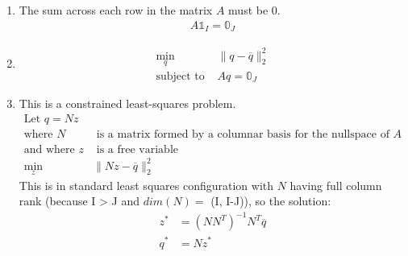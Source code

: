 \documentclass[11pt]{article}
\begin{document}
\begin{solution}
\begin{enumerate}
\item The sum across each row in the matrix $A$ must be 0.
\begin{align*}
    A \mathbb{1}_I = \mathbb{0}_J
\end{align*}

\item
\begin{align*}
    \min_q &\|q - \overline{q}\|_2^2 \\
    \text{subject to } & A q = \mathbb{0}_J
\end{align*}

\item This is a constrained least-squares problem.
\begin{align*}
    \text{Let } q = N z \\
    \text{where } N &\text{ is a matrix formed by a columnar basis for the nullspace of } A \\
    \text{and where } z& \text{ is a free variable} \\
    \min_z &\|Nz - \overline{q}\|_2^2
\end{align*}
        This is in standard least squares configuration with $N$ having full column rank (because I > J and $dim(N) = $ (I, I-J)), so the solution:
\begin{align*}
    z^* &= (N N^T)^{-1} N^T \overline{q} \\
    q^* &= N z^*
\end{align*}


\end{enumerate}
\end{solution}
\end{document}
